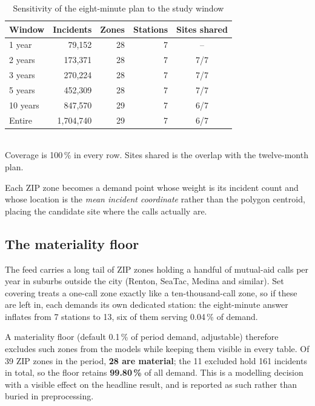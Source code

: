 \documentclass[conference]{IEEEtran}
\begin{document}
\begin{table}[htbp]
\caption{Sensitivity of the eight-minute plan to the study window}
\label{tab:window}
\centering
\small
\setlength{\tabcolsep}{4pt}
\begin{tabular}{@{}lrrrc@{}}
\toprule
\textbf{Window} & \textbf{Incidents} & \textbf{Zones} & \textbf{Stations}
& \textbf{Sites shared} \\
\midrule
1 year    &    79{,}152 & 28 & 7 & -- \\
2 years   &   173{,}371 & 28 & 7 & 7/7 \\
3 years   &   270{,}224 & 28 & 7 & 7/7 \\
5 years   &   452{,}309 & 28 & 7 & 7/7 \\
10 years  &   847{,}570 & 29 & 7 & 6/7 \\
Entire    & 1{,}704{,}740 & 29 & 7 & 6/7 \\
\bottomrule
\end{tabular}
\\[2pt]
\footnotesize Coverage is 100\,\% in every row. Sites shared is the overlap
with the twelve-month plan.
\end{table}

Each ZIP zone becomes a demand point whose weight is its incident count and
whose location is the \emph{mean incident coordinate} rather than the polygon
centroid, placing the candidate site where the calls actually are.

\subsection{The materiality floor}

The feed carries a long tail of ZIP zones holding a handful of mutual-aid calls
per year in suburbs outside the city (Renton, SeaTac, Medina and similar). Set
covering treats a one-call zone exactly like a ten-thousand-call zone, so if
these are left in, each demands its own dedicated station: the eight-minute
answer inflates from 7 stations to 13, six of them serving 0.04\,\% of demand.

A materiality floor (default 0.1\,\% of period demand, adjustable) therefore
excludes such zones from the models while keeping them visible in every table.
Of 39 ZIP zones in the period, \textbf{28 are material}; the 11 excluded hold
161 incidents in total, so the floor retains \textbf{99.80\,\%} of all demand.
This is a modelling decision with a visible effect on the headline result, and
is reported as such rather than buried in preprocessing.
\end{document}
